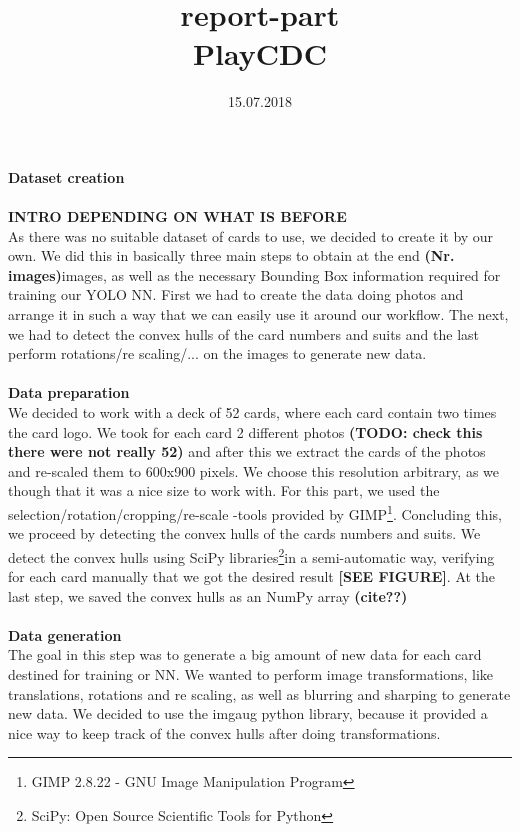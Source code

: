 \documentclass[a4paper]{article}
\title{\textbf{report-part}\\ PlayCDC}
\date{15.07.2018}
\begin{document}
\maketitle
\noindent \Large\textbf{Dataset creation} \\ \\
\normalsize
\textbf{INTRO DEPENDING ON WHAT IS BEFORE} \\
As there was no suitable dataset of cards to use, we decided to create it by our own.  We did this in basically three main steps to obtain at the end \textbf{(Nr. images)}images,  as well as the necessary  Bounding Box information required for training our YOLO NN.   First we had to create the data doing photos and arrange it in such a way that  we can easily use it around our workflow.  The next, we had to detect the convex hulls of the card numbers and suits and the last perform rotations/re scaling/... on the images to generate new data.\\ \\
\large \textbf{Data preparation} \\
\normalsize
We decided to work with a deck of 52 cards, where each card contain two times the card logo.  We took for each card 2 different photos \textbf{(TODO: check this there were not really 52)} and after this we extract the cards of the photos and re-scaled them to 600x900 pixels.  We choose this resolution arbitrary, as we though that it was a nice size to work with.
For this part, we used the selection/rotation/cropping/re-scale -tools provided by GIMP\footnote{GIMP 2.8.22 - GNU Image Manipulation Program}.
Concluding this, we proceed by detecting the convex hulls of the cards numbers and suits.  We detect the convex hulls using SciPy libraries\footnote{SciPy: Open Source Scientific Tools for Python}in a semi-automatic way, verifying for each card manually that we got the desired result \textbf{[SEE FIGURE]}.
At the last step, we saved the convex hulls as an NumPy array \textbf{(cite??)} \\ \\
\large \textbf{Data generation} \\
\normalsize
The goal in this step was to generate a big amount of new data for each card destined for training or NN. We wanted to perform image transformations, like translations, rotations and re scaling, as well as blurring and sharping to generate new data.  We decided to use the imgaug python library, because it provided a nice way to keep track of the convex hulls after doing transformations. 
\end{document}
